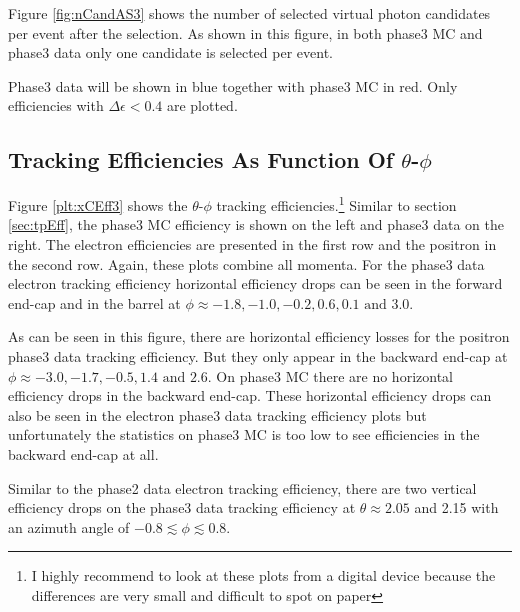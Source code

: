 \documentclass[a4paper,11pt,twosided,final,german,openbib,pdftex,listof=totoc,bibliography=totoc]{scrbook}
\begin{document}
Figure \ref{fig:nCandAS3} shows the number of selected virtual photon candidates per event after the selection. As shown in this figure, in both phase3 MC and phase3 data only one candidate is selected per event.




Phase3 data will be shown in blue together with phase3 MC in red. Only efficiencies with $\Delta \epsilon < 0.4$ are plotted.


\subsection{Tracking Efficiencies As Function Of $\theta$-$\phi$}
\label{sec:tpEff3}

Figure \ref{plt:xCEff3} shows the $\theta$-$\phi$ tracking efficiencies.\footnote{I highly recommend to look at these plots from a digital device because the differences are very small and difficult to spot on paper}
Similar to section \ref{sec:tpEff}, the phase3 MC efficiency is shown on the left and phase3 data on the right. The electron efficiencies are presented in the first row and the positron in the second row. Again, these plots combine all momenta. For the phase3 data electron tracking efficiency horizontal efficiency drops can be seen in the forward end-cap and in the barrel at $\phi \approx -1.8, -1.0, -0.2, 0.6, 0.1 \textrm{ and }3.0$. 

As can be seen in this figure, there are horizontal efficiency losses for the positron phase3 data tracking efficiency. But they only appear in the backward end-cap at $\phi \approx -3.0, -1.7, -0.5, 1.4 \textrm{ and } 2.6$. On phase3 MC there are no horizontal efficiency drops in the backward end-cap. These horizontal efficiency drops can also be seen in the electron phase3 data tracking efficiency plots but unfortunately the statistics on phase3 MC is too low to see efficiencies in the backward end-cap at all.

Similar to the phase2 data electron tracking efficiency, there are two vertical efficiency drops on the phase3 data tracking efficiency at $\theta \approx 2.05$ and 2.15 with an azimuth angle of $-0.8 \lesssim \phi \lesssim 0.8$.
\end{document}
